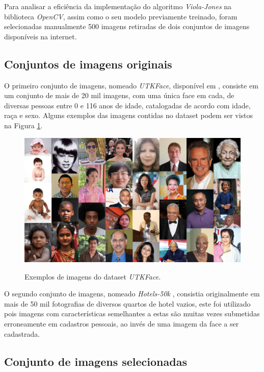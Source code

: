 Para analisar a eficiência da implementação do algoritmo \textit{Viola-Jones} na biblioteca \textit{OpenCV}, assim como o seu modelo previamente treinado, foram selecionadas manualmente 500 imagens retiradas de dois conjuntos de imagens disponíveis na internet.

\subsection{Conjuntos de imagens originais}

O primeiro conjunto de imagens, nomeado \textit{UTKFace}, disponível em \cite{utkface}, consiste em um conjunto de mais de 20 mil imagens, com uma única face em cada, de diversas pessoas entre 0 e 116 anos de idade, catalogadas de acordo com idade, raça e sexo. Alguns exemplos das imagens contidas no dataset podem ser vistos na Figura \ref{fig:exemplos-utk}.

\begin{figure}[htb]
    \centering
    \caption{Exemplos de imagens do dataset \textit{UTKFace}.}
    \includegraphics[scale=.3]{figs/exemplos-utk.png}
    \label{fig:exemplos-utk}
\end{figure}

O segundo conjunto de imagens, nomeado \textit{Hotels-50k} \cite{hotels50k-article}, consistia originalmente em mais de 50 mil fotografias de diversos quartos de hotel vazios, este foi utilizado pois imagens com características semelhantes a estas são muitas vezes submetidas erroneamente em cadastros pessoais, ao invés de uma imagem da face a ser cadastrada.

\subsection{Conjunto de imagens selecionadas}

